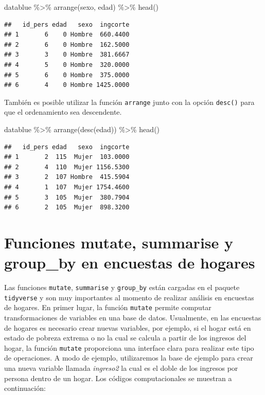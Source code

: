 \documentclass[
  12pt,
]{book}
\newenvironment{Shaded}{\begin{snugshade}}{\end{snugshade}}
\newcommand{\FunctionTok}[1]{\textcolor[rgb]{0.00,0.00,0.00}{#1}}
\newcommand{\NormalTok}[1]{#1}
\newcommand{\SpecialCharTok}[1]{\textcolor[rgb]{0.00,0.00,0.00}{#1}}
\begin{document}
\begin{Shaded}
\begin{Highlighting}[]
\NormalTok{datablue }\SpecialCharTok{\%\textgreater{}\%} \FunctionTok{arrange}\NormalTok{(sexo, edad) }\SpecialCharTok{\%\textgreater{}\%} \FunctionTok{head}\NormalTok{()}
\end{Highlighting}
\end{Shaded}

\begin{verbatim}
##   id_pers edad   sexo  ingcorte
## 1       6    0 Hombre  660.4400
## 2       6    0 Hombre  162.5000
## 3       3    0 Hombre  381.6667
## 4       5    0 Hombre  320.0000
## 5       6    0 Hombre  375.0000
## 6       4    0 Hombre 1425.0000
\end{verbatim}

También es posible utilizar la función \texttt{arrange} junto con la opción \texttt{desc()} para que el ordenamiento sea descendente.

\begin{Shaded}
\begin{Highlighting}[]
\NormalTok{datablue }\SpecialCharTok{\%\textgreater{}\%} \FunctionTok{arrange}\NormalTok{(}\FunctionTok{desc}\NormalTok{(edad)) }\SpecialCharTok{\%\textgreater{}\%} \FunctionTok{head}\NormalTok{()}
\end{Highlighting}
\end{Shaded}

\begin{verbatim}
##   id_pers edad   sexo  ingcorte
## 1       2  115  Mujer  103.0000
## 2       4  110  Mujer 1156.5300
## 3       2  107 Hombre  415.5904
## 4       1  107  Mujer 1754.4600
## 5       3  105  Mujer  380.7904
## 6       2  105  Mujer  898.3200
\end{verbatim}

\hypertarget{funciones-mutate-summarise-y-group_by-en-encuestas-de-hogares}{%
\section{\texorpdfstring{Funciones \textbf{mutate, summarise y group\_by} en encuestas de hogares}{Funciones mutate, summarise y group\_by en encuestas de hogares}}\label{funciones-mutate-summarise-y-group_by-en-encuestas-de-hogares}}

Las funciones \texttt{mutate}, \texttt{summarise} y \texttt{group\_by} están cargadas en el paquete \texttt{tidyverse} y son muy importantes al momento de realizar análisis en encuestas de hogares. En primer lugar, la función \texttt{mutate} permite computar transformaciones de variables en una base de datos. Usualmente, en las encuestas de hogares es necesario crear nuevas variables, por ejemplo, si el hogar está en estado de pobreza extrema o no la cual se calcula a partir de los ingresos del hogar, la función \texttt{mutate} proporciona una interface clara para realizar este tipo de operaciones. A modo de ejemplo, utilizaremos la base de ejemplo para crear una nueva variable llamada \emph{ingreso2} la cual es el doble de los ingresos por persona dentro de un hogar. Los códigos computacionales se muestran a continuación:
\end{document}
